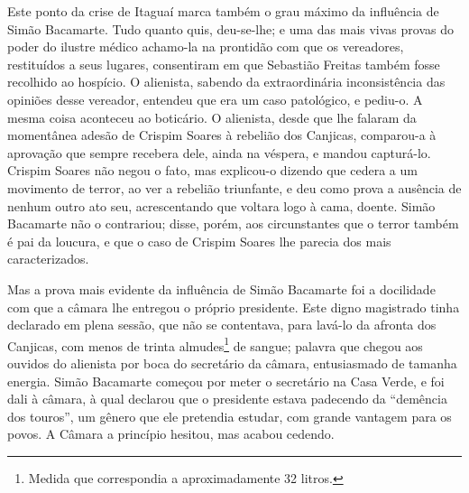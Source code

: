 Este ponto da crise de Itaguaí marca também o grau máximo da influência
de Simão Bacamarte. Tudo quanto quis, deu-se-lhe; e uma das mais vivas
provas do poder do ilustre médico achamo-la na prontidão com que os
vereadores, restituídos a seus lugares, consentiram em que Sebastião
Freitas também fosse recolhido ao hospício. O alienista, sabendo da
extraordinária inconsistência das opiniões desse vereador, entendeu que
era um caso patológico, e pediu-o. A mesma coisa aconteceu ao boticário.
O alienista, desde que lhe falaram da momentânea adesão de Crispim
Soares à rebelião dos Canjicas, comparou-a à aprovação que sempre
recebera dele, ainda na véspera, e mandou capturá-lo. Crispim Soares não
negou o fato, mas explicou-o dizendo que cedera a um movimento de
terror, ao ver a rebelião triunfante, e deu como prova a ausência de
nenhum outro ato seu, acrescentando que voltara logo à cama, doente.
Simão Bacamarte não o contrariou; disse, porém, aos circunstantes que o
terror também é pai da loucura, e que o caso de Crispim Soares lhe
parecia dos mais caracterizados.

Mas a prova mais evidente da influência de Simão Bacamarte foi a
docilidade com que a câmara lhe entregou o próprio presidente. Este
digno magistrado tinha declarado em plena sessão, que não se contentava,
para lavá-lo da afronta dos Canjicas, com menos de trinta
almudes\footnote{Medida que correspondia a aproximadamente 32 litros.}
de sangue; palavra que chegou aos ouvidos do alienista por boca do
secretário da câmara, entusiasmado de tamanha energia. Simão Bacamarte
começou por meter o secretário na Casa Verde, e foi dali à câmara, à
qual declarou que o presidente estava padecendo da ``demência dos
touros'', um gênero que ele pretendia estudar, com grande vantagem para
os povos. A Câmara a princípio hesitou, mas acabou cedendo.

